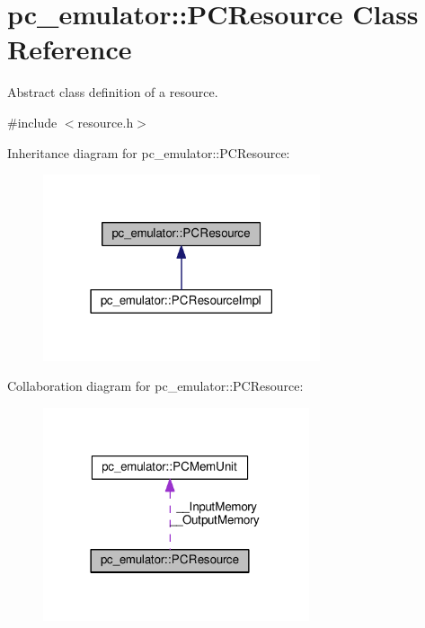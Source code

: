 \hypertarget{classpc__emulator_1_1PCResource}{}\section{pc\+\_\+emulator\+:\+:P\+C\+Resource Class Reference}
\label{classpc__emulator_1_1PCResource}


Abstract class definition of a resource.  




{\ttfamily \#include $<$resource.\+h$>$}



Inheritance diagram for pc\+\_\+emulator\+:\+:P\+C\+Resource\+:
\nopagebreak
\begin{figure}[H]
\begin{center}
\leavevmode
\includegraphics[width=231pt]{classpc__emulator_1_1PCResource__inherit__graph}
\end{center}
\end{figure}


Collaboration diagram for pc\+\_\+emulator\+:\+:P\+C\+Resource\+:
\nopagebreak
\begin{figure}[H]
\begin{center}
\leavevmode
\includegraphics[width=222pt]{classpc__emulator_1_1PCResource__coll__graph}
\end{center}
\end{figure}
